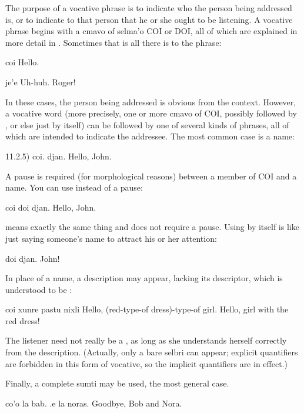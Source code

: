 The purpose of a vocative phrase is to indicate who the
    person being addressed is, or to indicate to that person that
    he or she ought to be listening. A vocative phrase begins with
    a cmavo of selma'o COI or DOI, all of which are explained in
    more detail in . Sometimes
    that is all there is to the phrase:
\begin{example}
coi\n
{}\n
Hello.
\end{example}

\begin{example}
je'e\n
{}\n
Uh-huh.\n
Roger!
\end{example}

In these cases, the person being addressed is obvious from the
    context. However, a vocative word (more precisely, one or more
    cmavo of COI, possibly followed by , or else just
     by itself) can be followed by one of several kinds of
    phrases, all of which are intended to indicate the addressee.
    The most common case is a name: 

\label{html:e11d2.5}
11.2.5)    coi. djan.
    Hello, John.

A pause is required (for morphological reasons) between a
    member of COI and a name. You can use  instead of a
    pause:
\begin{example}
coi doi djan.\n
Hello, John.
\end{example}

{\noindent}means exactly the same thing and does not require a pause.
    Using  by itself is like just saying someone's name to
    attract his or her attention:
\begin{example}
doi djan.\n
John!
\end{example}

In place of a name, a description may appear, lacking its
    descriptor, which is understood to be :
\begin{example}
coi xunre pastu nixli\n
Hello, (red-type-of dress)-type-of girl.\n
Hello, girl with the red dress!
\end{example}

The listener need not really be a , as
    long as she understands herself correctly from the description.
    (Actually, only a bare selbri can appear; explicit quantifiers
    are forbidden in this form of vocative, so the implicit
    quantifiers  are in effect.) 

Finally, a complete sumti may be used, the most general
    case.
\begin{example}
co'o la bab. .e la noras.\n
Goodbye, Bob and Nora.
\end{example}

